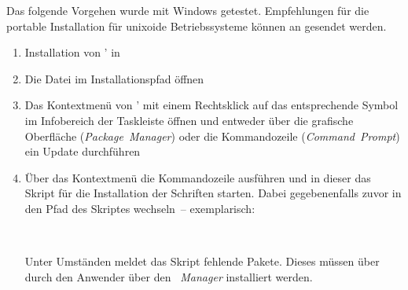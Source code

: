 %
Das folgende Vorgehen wurde mit Windows getestet. Empfehlungen für die portable 
Installation für unixoide Betriebssysteme können an \mailto{\TUDScriptContact} 
gesendet werden.
\begin{enumerate}
\item Installation von \TeXLive' in 
\item Die Datei  im Installationspfad öffnen
\item Das Kontextmenü von \TeXLive' mit einem Rechtsklick auf das entsprechende 
  Symbol im Infobereich der Taskleiste öffnen und entweder über die grafische 
  Oberfläche (\emph{Package~Manager}) oder die Kommandozeile 
  (\emph{Command~Prompt}) ein Update durchführen
\item Über das Kontextmenü die Kommandozeile ausführen und in dieser das Skript 
  für die Installation der Schriften  
  starten. Dabei gegebenenfalls zuvor in den Pfad des Skriptes 
  wechseln~-- exemplarisch:
  \begin{quoting}[leftmargin=1.5em,rightmargin=0pt]
  \newline%
  \,
  \end{quoting}
  Unter Umständen meldet das Skript fehlende Pakete. Dieses müssen über durch 
  den Anwender über den \emph{~Manager} installiert werden.
\end{enumerate}

